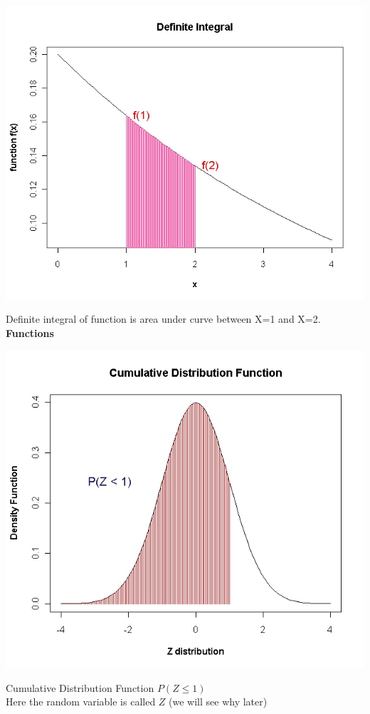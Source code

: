 \begin{center}
\includegraphics[scale=0.35]{images/6ADefiniteIntegral}
\end{center}
Definite integral of function is area under curve between X=1 and X=2.
\textbf{Functions}





\begin{center}
\includegraphics[scale=0.35]{images/6ACDF}
\end{center}
Cumulative Distribution Function $P(Z \leq 1)$ \\ Here the random variable is called $Z$ (we will see why later)









               
